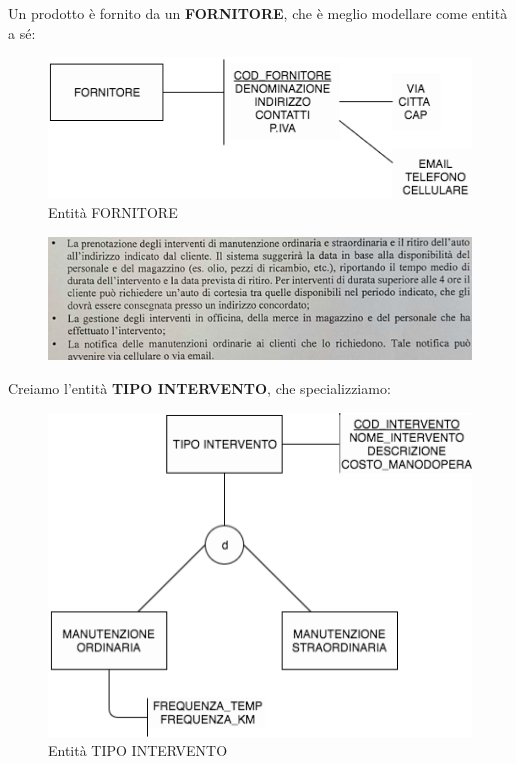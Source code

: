 Un prodotto è fornito da un \textbf{FORNITORE}, che è meglio modellare come entità a sé:

\begin{center}
\begin{figure}[H]
\centering
\includegraphics[scale=1]{figures/fornitore.png}
\caption{Entità FORNITORE}
\end{figure}
\end{center}

\begin{center}
\begin{figure}[H]
\centering
\includegraphics[scale=1]{figures/101120163.png}
\end{figure}
\end{center}

Creiamo l’entità \textbf{TIPO INTERVENTO}, che specializziamo:

\begin{center}
\begin{figure}[H]
\centering
\includegraphics[scale=1]{figures/tipo_intervento.png}
\caption{Entità TIPO INTERVENTO}
\end{figure}
\end{center}


